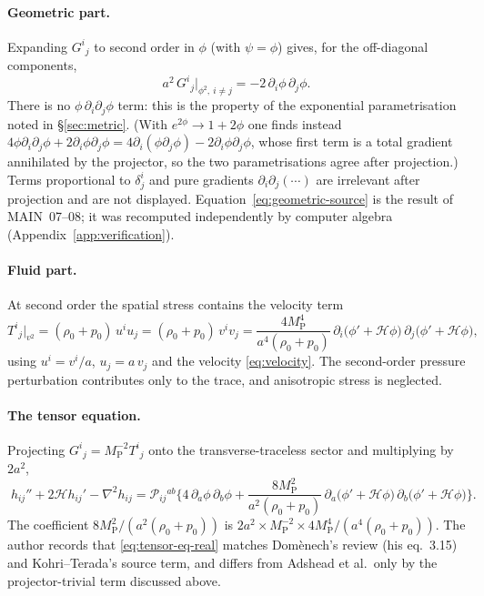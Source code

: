 \documentclass[11pt,a4paper]{article}
\newcommand{\cH}{\mathcal{H}}
\newcommand{\MP}{M_{\mathrm{P}}}
\newcommand{\note}[1]{\textsf{#1}}
\theoremstyle{remark}
\begin{document}
\paragraph{Geometric part.} Expanding $G^i{}_j$ to second order in $\phi$ (with $\psi = \phi$) gives, for the off-diagonal components,
\begin{equation}
a^2\,G^i{}_j\big|_{\phi^2,\ i\neq j} = -2\,\partial_i\phi\,\partial_j\phi .
\label{eq:geometric-source}
\end{equation}
There is no $\phi\,\partial_i\partial_j\phi$ term: this is the property of the exponential parametrisation noted in \S\ref{sec:metric}. (With $e^{2\phi}\to1+2\phi$ one finds instead $4\phi\partial_i\partial_j\phi + 2\partial_i\phi\partial_j\phi = 4\partial_i(\phi\partial_j\phi) - 2\partial_i\phi\partial_j\phi$, whose first term is a total gradient annihilated by the projector, so the two parametrisations agree after projection.) Terms proportional to $\delta^i_j$ and pure gradients $\partial_i\partial_j(\cdots)$ are irrelevant after projection and are not displayed. Equation~\eqref{eq:geometric-source} is the result of \note{MAIN}~07--08; it was recomputed independently by computer algebra (Appendix~\ref{app:verification}).

\paragraph{Fluid part.} At second order the spatial stress contains the velocity term
\begin{equation}
T^i{}_j\big|_{v^2} = (\rho_0+p_0)\,u^iu_j = (\rho_0+p_0)\,v^iv_j
= \frac{4\MP^4}{a^4(\rho_0+p_0)}\,\partial_i\big(\phi'+\cH\phi\big)\,\partial_j\big(\phi'+\cH\phi\big),
\label{eq:fluid-source}
\end{equation}
using $u^i = v^i/a$, $u_j = a\,v_j$ and the velocity \eqref{eq:velocity}. The second-order pressure perturbation contributes only to the trace, and anisotropic stress is neglected.

\paragraph{The tensor equation.} Projecting $G^i{}_j = \MP^{-2}T^i{}_j$ onto the transverse-traceless sector and multiplying by $2a^2$,
\begin{equation}
\boxed{\;
h_{ij}'' + 2\cH h_{ij}' - \nabla^2h_{ij}
= \mathcal{P}_{ij}{}^{ab}\Big\{4\,\partial_a\phi\,\partial_b\phi + \frac{8\MP^2}{a^2(\rho_0+p_0)}\,\partial_a\big(\phi'+\cH\phi\big)\,\partial_b\big(\phi'+\cH\phi\big)\Big\}.\;}
\label{eq:tensor-eq-real}
\end{equation}
The coefficient $8\MP^2/(a^2(\rho_0+p_0))$ is $2a^2\times\MP^{-2}\times4\MP^4/(a^4(\rho_0+p_0))$. The author records that \eqref{eq:tensor-eq-real} matches Dom\`enech's review (his eq.~3.15) and Kohri--Terada's source term, and differs from Adshead et al.\ only by the projector-trivial term discussed above.
\end{document}
